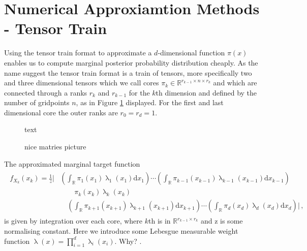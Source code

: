 \section{Numerical Approxiamtion Methods - Tensor Train}
Using the tensor train format to approximate a $d$-dimensional function $\pi(x)$ enables us to compute marginal posterior probability distribution cheaply.
As the name suggest the tensor train format is a train of tensors, more specifically two and three dimensional tensors which we call cores $\pi_{k} \in \mathbb{R}^{r_{k-1} \times n \times r_{k}}$  and which are connected through a ranks $r_{k}$ and $r_{k-1}$ for the $k$th dimension and defined by the number of gridpoints $n$, as in Figure \ref{} displayed.
For the first and last dimensional core the outer ranks are $r_0  = r_d = 1$.




\begin{figure}[ht!]
	\centering
{} 
\caption{text}
\label{key}
	
\end{figure}


\begin{figure}[ht!]
	\centering

	\caption{nice matries picture}
	\label{key}
	
\end{figure}


The approximated marginal target function
\begin{align}
	\begin{split}
	f_{X_k}(x_k) = \frac{1}{z}
	\Big|  &\left( \int_{\mathbb{R}} \pi_{1}(x_1) \uplambda_1(x_1)\text{d}x_{1} \right) \cdots \left( \int_{\mathbb{R}} \pi_{k-1}(x_{k-1}) \uplambda_{k-1}(x_{k-1}) \text{d}x_{k-1} \right) \\ & \qquad \pi_{k}(x_k)\uplambda_k(x_{k}) \\ &\quad \left( \int_{\mathbb{R}} \pi_{k+1}(x_{k+1})\uplambda_{k+1}(x_{k+1})\text{d}x_{k+1} \right) \cdots  \left( \int_{\mathbb{R}} \pi_{d}(x_d)\uplambda_d(x_{d})\text{d}x_d \right) \Big| \, ,
	\end{split} 
\end{align}
is given by integration over each core, where $k$th is in $\mathbb{R}^{r_{k-1} \times r_{k}}$ and z is some normalising constant.
Here we introduce some Lebesgue measurable weight function  $\uplambda(x) = \prod^d_{i=1} \uplambda_i(x_i)$.
Why? \cite{}.
\\


